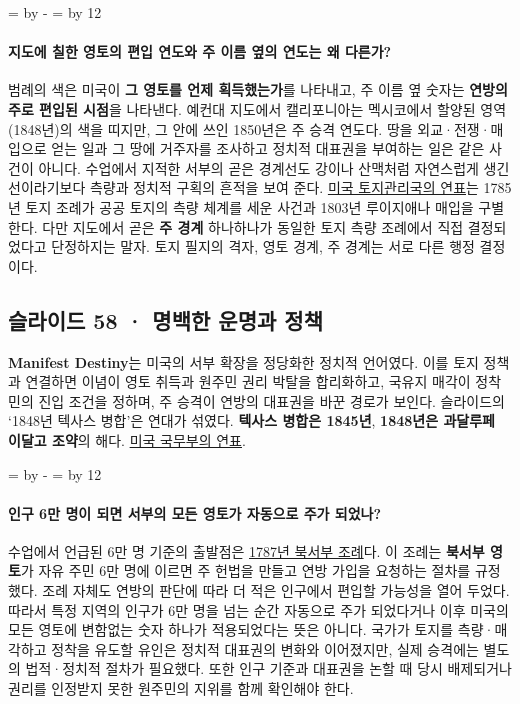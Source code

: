 \documentclass[10pt,a4paper]{article}
\newcommand{\ReserveQuestionSpace}{%
  \par\begingroup
  \dimen0=\pagegoal \advance\dimen0 by -\pagetotal
  \dimen2=\baselineskip \multiply\dimen2 by 12
  \ifdim\dimen0<\dimen2 \newpage\fi
  \endgroup}
\begin{document}
\ReserveQuestionSpace
\paragraph{지도에 칠한 영토의 편입 연도와 주 이름 옆의 연도는 왜 다른가?}
범례의 색은 미국이 \textbf{그 영토를 언제 획득했는가}를 나타내고, 주 이름 옆 숫자는 \textbf{연방의 주로 편입된 시점}을 나타낸다. 예컨대 지도에서 캘리포니아는 멕시코에서 할양된 영역(1848년)의 색을 띠지만, 그 안에 쓰인 1850년은 주 승격 연도다. 땅을 외교·전쟁·매입으로 얻는 일과 그 땅에 거주자를 조사하고 정치적 대표권을 부여하는 일은 같은 사건이 아니다. 수업에서 지적한 서부의 곧은 경계선도 강이나 산맥처럼 자연스럽게 생긴 선이라기보다 측량과 정치적 구획의 흔적을 보여 준다. \href{https://www.blm.gov/about/history/timeline}{미국 토지관리국의 연표}는 1785년 토지 조례가 공공 토지의 측량 체계를 세운 사건과 1803년 루이지애나 매입을 구별한다. 다만 지도에서 곧은 \textbf{주 경계} 하나하나가 동일한 토지 측량 조례에서 직접 결정되었다고 단정하지는 말자. 토지 필지의 격자, 영토 경계, 주 경계는 서로 다른 행정 결정이다.\par

\subsection{슬라이드 58 · 명백한 운명과 정책}
\textbf{Manifest Destiny}는 미국의 서부 확장을 정당화한 정치적 언어였다. 이를 토지 정책과 연결하면 이념이 영토 취득과 원주민 권리 박탈을 합리화하고, 국유지 매각이 정착민의 진입 조건을 정하며, 주 승격이 연방의 대표권을 바꾼 경로가 보인다. 슬라이드의 ‘1848년 텍사스 병합’은 연대가 섞였다. \textbf{텍사스 병합은 1845년}, \textbf{1848년은 과달루페 이달고 조약}의 해다. \href{https://history.state.gov/milestones/1830-1860/texas-annexation}{미국 국무부의 연표}.\par

\ReserveQuestionSpace
\paragraph{인구 6만 명이 되면 서부의 모든 영토가 자동으로 주가 되었나?}
수업에서 언급된 6만 명 기준의 출발점은 \href{https://www.archives.gov/milestone-documents/northwest-ordinance}{1787년 북서부 조례}다. 이 조례는 \textbf{북서부 영토}가 자유 주민 6만 명에 이르면 주 헌법을 만들고 연방 가입을 요청하는 절차를 규정했다. 조례 자체도 연방의 판단에 따라 더 적은 인구에서 편입할 가능성을 열어 두었다. 따라서 특정 지역의 인구가 6만 명을 넘는 순간 자동으로 주가 되었다거나 이후 미국의 모든 영토에 변함없는 숫자 하나가 적용되었다는 뜻은 아니다. 국가가 토지를 측량·매각하고 정착을 유도할 유인은 정치적 대표권의 변화와 이어졌지만, 실제 승격에는 별도의 법적·정치적 절차가 필요했다. 또한 인구 기준과 대표권을 논할 때 당시 배제되거나 권리를 인정받지 못한 원주민의 지위를 함께 확인해야 한다.\par
\end{document}
